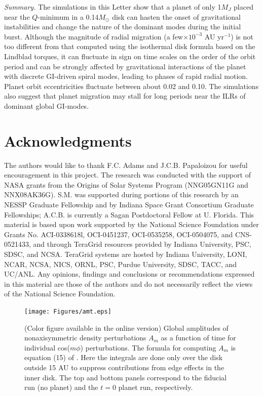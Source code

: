 \documentclass[12pt,manuscript,authoryear]{aastex}
\begin{document}
{\it Summary.} The simulations in this Letter show that a planet of only 1$M_J$ placed near the $Q$-minimum in a 0.14$M_{\odot}$ disk can hasten the onset of gravitational instabilities and change the nature of the dominant modes during the initial burst. Although the magnitude of radial migration (a few$\times10^{-3}$ AU yr$^{-1}$) is not too different from that computed using the \citet{tanaka2002}  isothermal disk formula based on the Lindblad torques, it can fluctuate in sign on time scales on the order of the orbit period and can be strongly affected by gravitational interactions of the planet with discrete GI-driven spiral modes, leading to phases of rapid radial motion. Planet orbit eccentricities fluctuate between about 0.02 and 0.10. The simulations also suggest that planet migration may stall for long periods near the ILRs of dominant global GI-modes.

\section{Acknowledgments}

The authors would like to thank F.C. Adams and J.C.B. Papaloizou for useful encouragement in this project. The research was conducted with the support of NASA grants from the Origins of Solar Systems  Program (NNG05GN11G and NNX08AK36G). S.M. was supported during portions of this research by an NESSP Graduate Fellowship and by Indiana Space Grant Consortium Graduate Fellowships; A.C.B. is currently a Sagan Postdoctoral Fellow at U. Florida. This material is based upon work supported by the National Science Foundation under Grants No. ACI-0338618l, OCI-0451237, OCI-0535258, OCI-0504075, and CNS-0521433, and through TeraGrid resources provided by Indiana University, PSC, SDSC, and NCSA. TeraGrid systems are hosted by Indiana University, LONI, NCAR, NCSA, NICS, ORNL, PSC, Purdue University, SDSC, TACC, and UC/ANL. Any opinions, findings and conclusions or recommendations expressed in this material are those of the authors and do not necessarily reflect the views of the National Science Foundation. 




\newpage


\begin{figure}[t]
\center
\texttt{[image: Figures/amt.eps]}
\caption{(Color figure available in the online version) Global amplitudes of nonaxisymmetric density perturbations $A_m$ as a function of time for individual cos($m\phi$) perturbations. The formula for computing $A_m$ is equation (15) of \citep{boley2006}. Here the integrals are done only over the disk outside 15 AU to suppress contributions from edge effects in the inner disk. The top and bottom panels correspond to the fiducial run (no planet) and the $t = 0$ planet run, respectively.}
\label{fig:Am}
\end{figure}
\end{document}
